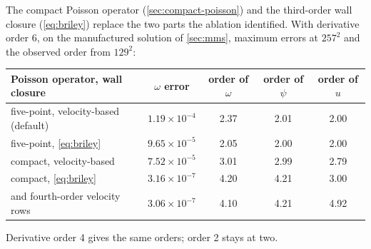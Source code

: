\documentclass[11pt,a4paper]{article}
\begin{document}
The compact Poisson operator (\cref{sec:compact-poisson}) and the third-order wall closure (\cref{eq:briley}) replace the two parts the ablation identified.  With derivative order 6, on the manufactured solution of \cref{sec:mms}, maximum errors at $257^2$ and the observed order from $129^2$:
\begin{center}
\begin{tabular}{lcccc}
\toprule
Poisson operator, wall closure & $\omega$ error & order of $\omega$ & order of $\psi$ & order of $u$ \\
\midrule
five-point, velocity-based (default) & $1.19\times10^{-4}$ & 2.37 & 2.01 & 2.00 \\
five-point, \cref{eq:briley} & $9.65\times10^{-5}$ & 2.05 & 2.00 & 2.00 \\
compact, velocity-based & $7.52\times10^{-5}$ & 3.01 & 2.99 & 2.79 \\
compact, \cref{eq:briley} & $3.16\times10^{-7}$ & 4.20 & 4.21 & 3.00 \\
\quad and fourth-order velocity rows & $3.06\times10^{-7}$ & 4.10 & 4.21 & 4.92 \\
\bottomrule
\end{tabular}
\end{center}
Derivative order 4 gives the same orders; order 2 stays at two.
\end{document}
